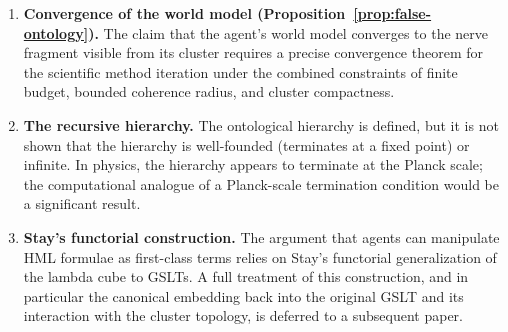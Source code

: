 \begin{enumerate}[label=\textbf{Gap \arabic*.}, leftmargin=*, itemsep=8pt]
  \item \textbf{Convergence of the world model (Proposition~\ref{prop:false-ontology}).}
        The claim that the agent's world model converges to the
        nerve fragment visible from its cluster requires a precise
        convergence theorem for the scientific method iteration
        under the combined constraints of finite budget, bounded
        coherence radius, and cluster compactness.

  \item \textbf{The recursive hierarchy.}
        The ontological hierarchy is defined, but it is not shown
        that the hierarchy is well-founded (terminates at a fixed
        point) or infinite.
        In physics, the hierarchy appears to terminate at the
        Planck scale; the computational analogue of a Planck-scale
        termination condition would be a significant result.

  \item \textbf{Stay's functorial construction.}
        The argument that agents can manipulate
        HML formulae as first-class terms relies on Stay's
        functorial generalization of the lambda cube to GSLTs.
        A full treatment of this construction, and in particular
        the canonical embedding back into the original GSLT and
        its interaction with the cluster topology, is deferred
        to a subsequent paper.

\end{enumerate}

